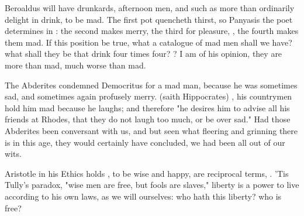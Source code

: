 Beroaldus will have drunkards, afternoon men, and such as more than ordinarily
delight in drink, to be mad. The first pot quencheth thirst, so Panyasis the
poet determines in : the
second makes merry, the third for pleasure, , the
fourth makes them mad. If this position be true, what a catalogue of mad men
shall we have? what shall they be that drink four times four? ? I am of his opinion,
they are more than mad, much worse than mad.

The Abderites condemned Democritus for a mad man, because
he was sometimes sad, and sometimes again profusely merry. 
(saith Hippocrates) , his countrymen
hold him mad because he laughs; and therefore "he desires
him to advise all his friends at Rhodes, that they do not laugh too much, or be
over sad." Had those Abderites been conversant with us, and but seen what
fleering and grinning there is in this age, they would
certainly have concluded, we had been all out of our wits.

Aristotle in his Ethics holds , to be wise and happy,
are reciprocal terms, . 'Tis
Tully's paradox, "wise men are free, but fools are slaves,"
liberty is a power to live according to his own laws, as we will ourselves: who
hath this liberty? who is free?



